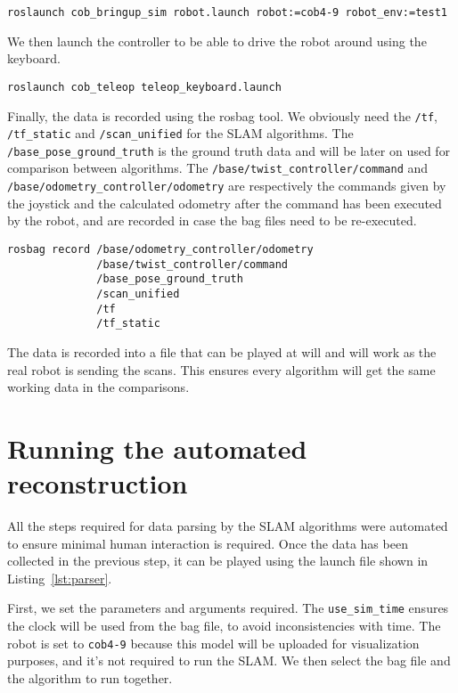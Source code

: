 \begin{verbatim}
roslaunch cob_bringup_sim robot.launch robot:=cob4-9 robot_env:=test1
\end{verbatim}

We then launch the controller to be able to drive the robot around using the keyboard.

\begin{verbatim}
roslaunch cob_teleop teleop_keyboard.launch 
\end{verbatim}

Finally, the data is recorded using the rosbag tool. We obviously need the \texttt{/tf}, \texttt{/tf\_static} and \texttt{/scan\_unified} for the SLAM algorithms. The \texttt{/base\_pose\_ground\_truth} is the ground truth data and will be later on used for comparison between algorithms. The \texttt{/base/twist\_controller/command} and  \texttt{/base/odometry\_controller/odometry} are respectively the commands given by the joystick and the calculated odometry after the command has been executed by the robot, and are recorded in case the bag files need to be re-executed.

\begin{verbatim}
rosbag record /base/odometry_controller/odometry
              /base/twist_controller/command
              /base_pose_ground_truth
              /scan_unified
              /tf
              /tf_static
\end{verbatim}

The data is recorded into a file that can be played at will and will work as the real robot is sending the scans. This ensures every algorithm will get the same working data in the comparisons.

\section{Running the automated reconstruction}

All the steps required for data parsing by the SLAM algorithms were automated to ensure minimal human interaction is required. Once the data has been collected in the previous step, it can be played using the launch file shown in Listing~\ref{lst:parser}.

First, we set the parameters and arguments required. The \texttt{use\_sim\_time} ensures the clock will be used from the bag file, to avoid inconsistencies with time. The robot is set to \texttt{cob4-9} because this model will be uploaded for visualization purposes, and it's not required to run the SLAM. We then select the bag file and the algorithm to run together.


